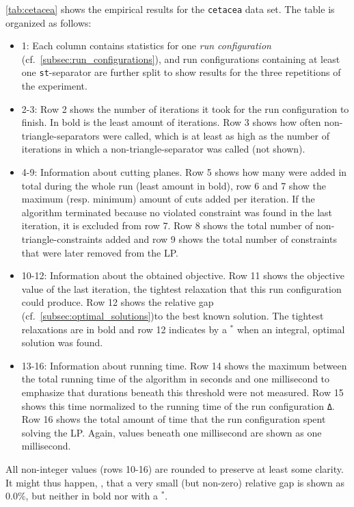 \begin{landscape}
\cref{tab:cetacea} shows the empirical results for the \texttt{cetacea} data set.
The table is organized as follows:
\begin{itemize}
	\item 1: Each column contains statistics for one \textit{run configuration} (cf.\ \cref{subsec:run_configurations}),
		and run configurations containing at least one \texttt{st}-separator are further split to show results for the three repetitions of the experiment.
	\item 2-3: Row 2 shows the number of iterations it took for the run configuration to finish. 
		In bold is the least amount of iterations.
		Row 3 shows how often non-triangle-separators were called, which is at least as high as the number of iterations in which a non-triangle-separator was called (not shown).
	\item 4-9: Information about cutting planes. 
		Row 5 shows how many were added in total during the whole run (least amount in bold),
		row 6 and 7 show the maximum (resp. minimum) amount of cuts added per iteration.
		If the algorithm terminated because no violated constraint was found in the last iteration, it is excluded from row 7.
		Row 8 shows the total number of non-triangle-constraints added
		and row 9 shows the total number of constraints that were later removed from the LP.
	\item 10-12: Information about the obtained objective.
		Row 11 shows the objective value of the last iteration, \ie the tightest relaxation that this run configuration could produce.
		Row 12 shows the relative gap (cf.\ \cref{subsec:optimal_solutions})to the best known solution.
		The tightest relaxations are in bold and row 12 indicates by a $^{*}$ when an integral, \ie optimal solution was found.
	\item 13-16: Information about running time.
		Row 14 shows the maximum between the total running time of the algorithm in seconds and one millisecond to emphasize that durations beneath this threshold were not measured.
		Row 15 shows this time normalized to the running time of the run configuration \texttt{Δ}.
		Row 16 shows the total amount of time that the run configuration spent solving the LP. Again, values beneath one millisecond are shown as one millisecond.
\end{itemize}
All non-integer values (rows 10-16) are rounded to preserve at least some clarity.
It might thus happen, \eg, that a very small (but non-zero) relative gap is shown as $0.0\%$, but neither in bold nor with a $^{*}$.


\end{landscape}
